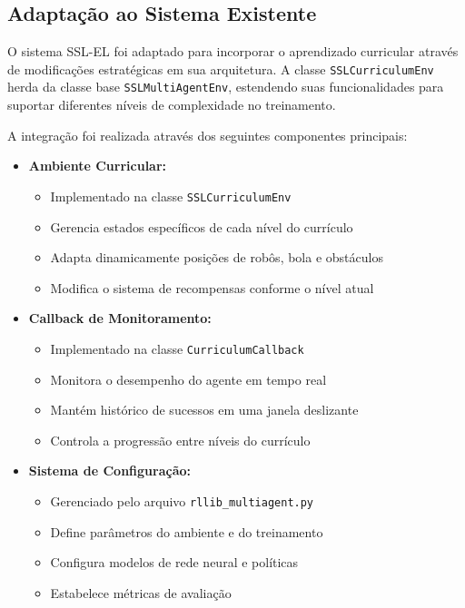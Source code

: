 \subsection{Adaptação ao Sistema Existente}
O sistema SSL-EL foi adaptado para incorporar o aprendizado curricular através de modificações estratégicas em sua arquitetura. A classe \texttt{SSLCurriculumEnv} herda da classe base \texttt{SSLMultiAgentEnv}, estendendo suas funcionalidades para suportar diferentes níveis de complexidade no treinamento.

A integração foi realizada através dos seguintes componentes principais:

\begin{itemize}
    \item \textbf{Ambiente Curricular:}
    \begin{itemize}
        \item Implementado na classe \texttt{SSLCurriculumEnv}
        \item Gerencia estados específicos de cada nível do currículo
        \item Adapta dinamicamente posições de robôs, bola e obstáculos
        \item Modifica o sistema de recompensas conforme o nível atual
    \end{itemize}

    \item \textbf{Callback de Monitoramento:}
    \begin{itemize}
        \item Implementado na classe \texttt{CurriculumCallback}
        \item Monitora o desempenho do agente em tempo real
        \item Mantém histórico de sucessos em uma janela deslizante
        \item Controla a progressão entre níveis do currículo
    \end{itemize}

    \item \textbf{Sistema de Configuração:}
    \begin{itemize}
        \item Gerenciado pelo arquivo \texttt{rllib\_multiagent.py}
        \item Define parâmetros do ambiente e do treinamento
        \item Configura modelos de rede neural e políticas
        \item Estabelece métricas de avaliação
    \end{itemize}
\end{itemize}

